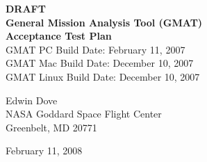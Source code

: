 \begin{center}
{\renewcommand{\thefootnote}{\fnsymbol{footnote}} { \huge \bf DRAFT
\\General Mission Analysis Tool (GMAT)\\ Acceptance Test Plan\\}
\vspace{0.1in} {GMAT PC Build Date: February 11, 2007}\\
\vspace{0.1in} {GMAT Mac Build Date: December 10, 2007}\\
\vspace{0.1in} {GMAT Linux Build Date: December 10, 2007}}
\end{center}


\begin{center}
Edwin Dove\\

NASA Goddard Space Flight Center\\
Greenbelt, MD 20771

February 11, 2008
\end{center}

\clearpage
\clearpage
